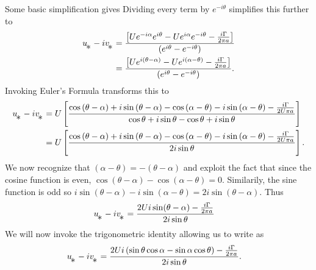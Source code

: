 \documentclass[12pt]{book}
\begin{document}
{
Some basic simplification gives
Dividing every term by $e^{-i\theta}$ simplifies this further to
\begin{align*}
u\substar - iv\substar &= \frac{\left[Ue^{-i\alpha}e^{i\theta} - Ue^{i\alpha}e^{-i\theta} - \frac{i\Gamma }{2\pi a}\right]}{\left(e^{i\theta} - e^{-i\theta} \right) } \\
 &= \frac{\left[Ue^{i(\theta - \alpha)} - Ue^{i(\alpha-\theta)} - \frac{i\Gamma }{2\pi a}\right]}{\left(e^{i\theta} - e^{-i\theta} \right) }.
\end{align*}
Invoking Euler's Formula transforms this to
 \begin{align*}
u\substar - iv\substar &= U\left[\frac{\cos\left(\theta - \alpha\right) + i\sin\left(\theta - \alpha\right) - \cos\left(\alpha - \theta\right) - i\sin\left(\alpha - \theta\right) - \frac{i\Gamma }{2U\pi a}}{\cos\theta + i\sin\theta - \cos\theta + i\sin\theta  } \right]\\ 
&= U\left[\frac{\cos\left(\theta - \alpha\right) + i\sin\left(\theta - \alpha\right) - \cos\left(\alpha - \theta\right) - i\sin\left(\alpha - \theta\right) - \frac{i\Gamma }{2U\pi a}}{2i\sin\theta} \right].
\end{align*}
We now recognize that $(\alpha - \theta) = -(\theta - \alpha)$ and exploit the fact that since the cosine function is even, $\cos(\theta - \alpha) - \cos(\alpha - \theta) = 0$.  Similarily, the sine function is odd so $i\sin(\theta - \alpha) - i\sin(\alpha - \theta) = 2i\sin(\theta - \alpha)$.  Thus
\begin{align}
u\substar - iv\substar &= \frac{2Ui\sin(\theta - \alpha) - \frac{i\Gamma }{2\pi a} }{2i\sin\theta}
\label{4-2_intermediateStep1}
\end{align}
We will now invoke the trigonometric identity 
 allowing us to write  as
\begin{align}
u\substar - iv\substar &= \frac{2Ui\left(\sin\theta\cos\alpha - \sin\alpha\cos\theta\right) - \frac{i\Gamma }{2\pi a} }{2i\sin\theta}.
\label{4-2_intermediateStep2}
\end{align}
}
\end{document}
